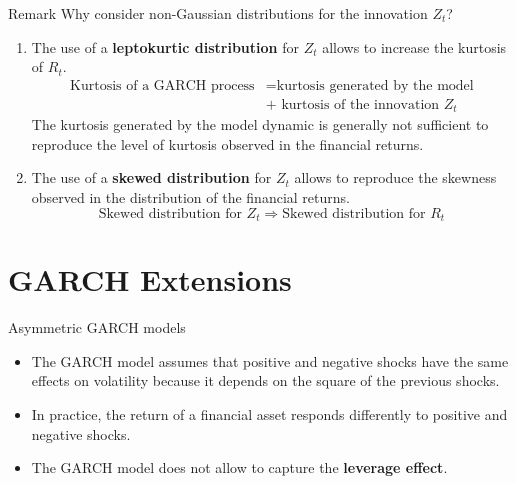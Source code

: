 \documentclass{beamer}
\newcommand{\imfbold}[1]{\textbf{\textcolor{imfblue}{#1}}}
\begin{document}
\begin{frame}{Remark}
\small
    Why consider non-Gaussian distributions for the innovation $Z_t$?
    \begin{enumerate}
        \item The use of a \imfbold{leptokurtic distribution} for $Z_t$ allows to increase the kurtosis of $R_t$.
        \begin{align*}
          \text{Kurtosis of a GARCH process}  &= \text{kurtosis generated by the model} \\
                                              &+ \text{ kurtosis of the innovation } Z_t  
        \end{align*}
        The kurtosis generated by the model dynamic is generally not sufficient to reproduce the level of kurtosis observed in the financial returns.

        \item The use of a \imfbold{skewed distribution} for $Z_t$ allows to reproduce the skewness observed in the distribution of the financial returns.
        $$ \text{Skewed distribution for }Z_t \Rightarrow \text{Skewed distribution for }R_t$$
    \end{enumerate}
\end{frame}

\section{GARCH Extensions}
\begin{frame}{Asymmetric GARCH models}
\begin{itemize}
    \item The GARCH model assumes that positive and negative shocks have the same effects on volatility because it depends on the square of the previous shocks.
    \item In practice, the return of a financial asset responds differently to positive and negative shocks.
    \item The GARCH model does not allow to capture the \imfbold{leverage effect}. 
\end{itemize}
\end{frame}
\end{document}
